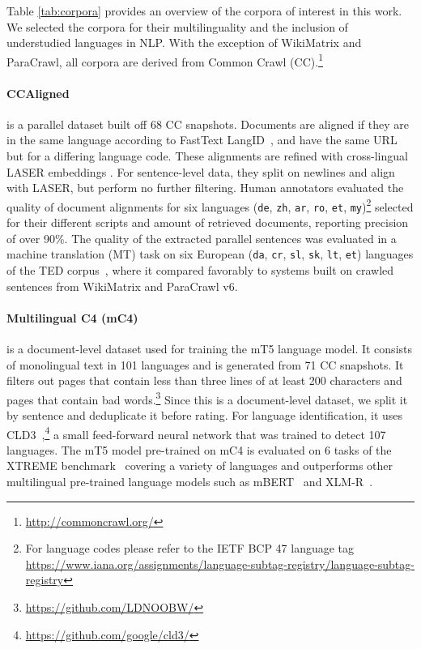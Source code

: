 Table \ref{tab:corpora} provides an overview of the corpora of interest in this work. We selected the corpora for their multilinguality and the inclusion of understudied languages in NLP. With the exception of WikiMatrix and ParaCrawl, all corpora are derived from Common Crawl (CC).\footnote{\url{http://commoncrawl.org/}}

\paragraph{CCAligned~\citep{el-kishky-etal-2020-ccaligned}}is a parallel dataset built off 68 CC snapshots. Documents are aligned if they are in the same language according to FastText LangID~\citep{joulin-etal-2016-fasttext,joulin-etal-2017-bag}, and have the same URL but for a differing language code. These alignments are refined with cross-lingual LASER embeddings \citep{artetxe-schwenk-2019-massively}. For sentence-level data, they split on newlines and align with LASER, but perform no further filtering. Human annotators evaluated the quality of document alignments for six languages (\texttt{de}, \texttt{zh}, \texttt{ar}, \texttt{ro}, \texttt{et}, \texttt{my})\footnote{For language codes please refer to the IETF BCP 47 language tag \url{https://www.iana.org/assignments/language-subtag-registry/language-subtag-registry}} selected for their different scripts and amount of retrieved documents, reporting precision of over 90\%. The quality of the extracted parallel sentences was evaluated in a machine translation (MT) task on six European (\texttt{da}, \texttt{cr}, \texttt{sl}, \texttt{sk}, \texttt{lt}, \texttt{et}) languages of the TED corpus~\citep{qi-etal-2018-pre}, where it compared favorably to systems built on crawled sentences from WikiMatrix and ParaCrawl v6.

\paragraph{Multilingual C4 (mC4)~\citep{xue-etal-2021-mt5}} is a document-level dataset used for training the mT5 language model. It consists of monolingual text in 101 languages and is generated from 71 CC snapshots. It filters out pages that contain less than three lines of at least 200 characters and pages that contain bad words.\footnote{\url{https://github.com/LDNOOBW/}} Since this is a document-level dataset, we split it by sentence and deduplicate it before rating. For language identification, it uses CLD3~\citep{botha-etal-2017-natural},\footnote{\url{https://github.com/google/cld3/}} a small feed-forward neural network that was trained to detect 107 languages. The mT5 model pre-trained on mC4 is evaluated on 6 tasks of the XTREME benchmark~\citep{hu-etal-2020-xtreme} covering a variety of languages and outperforms other multilingual pre-trained language models such as mBERT~\citep{devlin-etal-2019-bert} and XLM\nobreakdash-R~\citep{conneau-etal-2020-unsupervised}.

